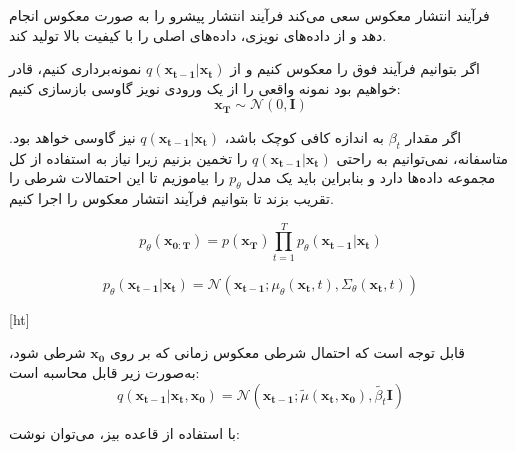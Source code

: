 فرآیند انتشار معکوس سعی می‌کند فرآیند انتشار پیشرو را به صورت معکوس انجام دهد و از داده‌های نویزی، داده‌های اصلی را با کیفیت بالا تولید کند.


اگر بتوانیم فرآیند فوق را معکوس کنیم و از $ q(\mathbf{x_{t-1}}|\mathbf{x_t}) $ نمونه‌برداری کنیم، قادر خواهیم بود نمونه واقعی را از یک ورودی نویز گاوسی بازسازی کنیم:
\begin{equation}
	\mathbf{x_T} \sim \mathcal{N}(0, \mathbf{I})
\end{equation}

اگر مقدار $\beta_t$ به اندازه کافی کوچک باشد، $ q(\mathbf{x_{t-1}}|\mathbf{x_t}) $ نیز گاوسی خواهد بود. متاسفانه، نمی‌توانیم به راحتی $ q(\mathbf{x_{t-1}}|\mathbf{x_t}) $ را تخمین بزنیم زیرا نیاز به استفاده از کل مجموعه داده‌ها دارد و بنابراین باید یک مدل $ p_\theta $ را بیاموزیم تا این احتمالات شرطی را تقریب بزند تا بتوانیم فرآیند انتشار معکوس را اجرا کنیم.

\begin{equation}
	p_\theta(\mathbf{x_{0:T}}) = p(\mathbf{x_T}) \prod_{t=1}^{T} p_\theta(\mathbf{x_{t-1}}|\mathbf{x_t})
\end{equation}

\begin{equation}
	p_\theta(\mathbf{x_{t-1}}|\mathbf{x_t}) = \mathcal{N}(\mathbf{x_{t-1}}; \mu_\theta(\mathbf{x_t}, t), \Sigma_\theta(\mathbf{x_t}, t))
\end{equation}


[ht]



قابل توجه است که احتمال شرطی معکوس زمانی که بر روی $\mathbf{x_0}$ شرطی شود، به‌صورت زیر قابل محاسبه است:
\begin{equation}
	q(\mathbf{x_{t-1}}|\mathbf{x_t}, \mathbf{x_0}) = \mathcal{N}(\mathbf{x_{t-1}}; \tilde{\mu}(\mathbf{x_t}, \mathbf{x_0}), \tilde{\beta_t} \mathbf{I})
\end{equation}

با استفاده از قاعده بیز، می‌توان نوشت:


